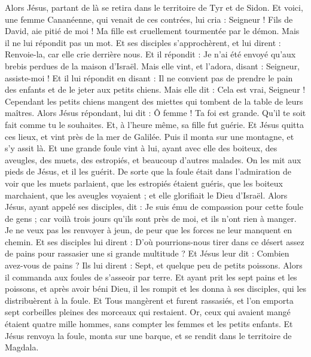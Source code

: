 \begin{multicols}{2}
Alors Jésus, partant de là se retira dans le territoire de Tyr et de Sidon.
Et voici, une femme Cananéenne, qui venait de ces contrées, lui cria : Seigneur ! Fils de David, aie pitié de moi ! Ma fille est cruellement tourmentée par le démon.
Mais il ne lui répondit pas un mot. Et ses disciples s'approchèrent, et lui dirent : Renvoie-la, car elle crie derrière nous.
Et il répondit : Je n'ai été envoyé qu'aux brebis perdues de la maison d'Israël.
Mais elle vint, et l'adora, disant : Seigneur, assiste-moi !
Et il lui répondit en disant : Il ne convient pas de prendre le pain des enfants et de le jeter aux petits chiens.
Mais elle dit : Cela est vrai, Seigneur ! Cependant les petits chiens mangent des miettes qui tombent de la table de leurs maîtres.
Alors Jésus répondant, lui dit : Ô femme ! Ta foi est grande. Qu'il te soit fait comme tu le souhaites. Et, à l'heure même, sa fille fut guérie.
Et Jésus quitta ces lieux, et vint près de la mer de Galilée. Puis il monta sur une montagne, et s'y assit là.
Et une grande foule vint à lui, ayant avec elle des boiteux, des aveugles, des muets, des estropiés, et beaucoup d'autres malades. On les mit aux pieds de Jésus, et il les guérit.
De sorte que la foule était dans l'admiration de voir que les muets parlaient, que les estropiés étaient guéris, que les boiteux marchaient, que les aveugles voyaient ; et elle glorifiait le Dieu d'Israël.
Alors Jésus, ayant appelé ses disciples, dit : Je suis ému de compassion pour cette foule de gens ; car voilà trois jours qu'ils sont près de moi, et ils n'ont rien à manger. Je ne veux pas les renvoyer à jeun, de peur que les forces ne leur manquent en chemin.
Et ses disciples lui dirent : D'où pourrions-nous tirer dans ce désert assez de pains pour rassasier une si grande multitude ?
Et Jésus leur dit : Combien avez-vous de pains ? Ils lui dirent : Sept, et quelque peu de petits poissons.
Alors il commanda aux foules de s'asseoir par terre.
Et ayant prit les sept pains et les poissons, et après avoir béni Dieu, il les rompit et les donna à ses disciples, qui les distribuèrent à la foule.
Et Tous mangèrent et furent rassasiés, et l'on emporta sept corbeilles pleines des morceaux qui restaient.
Or, ceux qui avaient mangé étaient quatre mille hommes, sans compter les femmes et les petits enfants.
Et Jésus renvoya la foule, monta sur une barque, et se rendit dans le territoire de Magdala.

\end{multicols}
